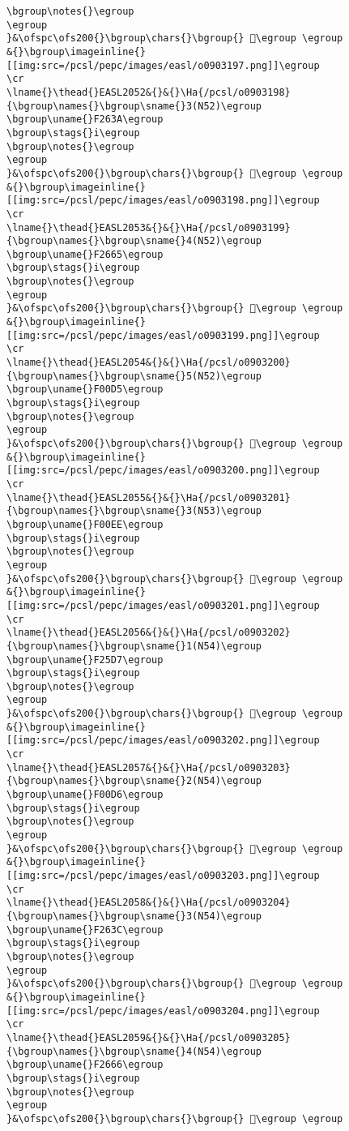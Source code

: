 \begin{verbatim}
\bgroup\notes{}\egroup
\egroup
}&\ofspc\ofs200{}\bgroup\chars{}\bgroup{} 󰃔\egroup \egroup
&{}\bgroup\imageinline{}[[img:src=/pcsl/pepc/images/easl/o0903197.png]]\egroup
\cr
\lname{}\thead{}EASL2052&{}&{}\Ha{/pcsl/o0903198}{\bgroup\names{}\bgroup\sname{}3(N52)\egroup
\bgroup\uname{}F263A\egroup
\bgroup\stags{}i\egroup
\bgroup\notes{}\egroup
\egroup
}&\ofspc\ofs200{}\bgroup\chars{}\bgroup{} 󲘺\egroup \egroup
&{}\bgroup\imageinline{}[[img:src=/pcsl/pepc/images/easl/o0903198.png]]\egroup
\cr
\lname{}\thead{}EASL2053&{}&{}\Ha{/pcsl/o0903199}{\bgroup\names{}\bgroup\sname{}4(N52)\egroup
\bgroup\uname{}F2665\egroup
\bgroup\stags{}i\egroup
\bgroup\notes{}\egroup
\egroup
}&\ofspc\ofs200{}\bgroup\chars{}\bgroup{} 󲙥\egroup \egroup
&{}\bgroup\imageinline{}[[img:src=/pcsl/pepc/images/easl/o0903199.png]]\egroup
\cr
\lname{}\thead{}EASL2054&{}&{}\Ha{/pcsl/o0903200}{\bgroup\names{}\bgroup\sname{}5(N52)\egroup
\bgroup\uname{}F00D5\egroup
\bgroup\stags{}i\egroup
\bgroup\notes{}\egroup
\egroup
}&\ofspc\ofs200{}\bgroup\chars{}\bgroup{} 󰃕\egroup \egroup
&{}\bgroup\imageinline{}[[img:src=/pcsl/pepc/images/easl/o0903200.png]]\egroup
\cr
\lname{}\thead{}EASL2055&{}&{}\Ha{/pcsl/o0903201}{\bgroup\names{}\bgroup\sname{}3(N53)\egroup
\bgroup\uname{}F00EE\egroup
\bgroup\stags{}i\egroup
\bgroup\notes{}\egroup
\egroup
}&\ofspc\ofs200{}\bgroup\chars{}\bgroup{} 󰃮\egroup \egroup
&{}\bgroup\imageinline{}[[img:src=/pcsl/pepc/images/easl/o0903201.png]]\egroup
\cr
\lname{}\thead{}EASL2056&{}&{}\Ha{/pcsl/o0903202}{\bgroup\names{}\bgroup\sname{}1(N54)\egroup
\bgroup\uname{}F25D7\egroup
\bgroup\stags{}i\egroup
\bgroup\notes{}\egroup
\egroup
}&\ofspc\ofs200{}\bgroup\chars{}\bgroup{} 󲗗\egroup \egroup
&{}\bgroup\imageinline{}[[img:src=/pcsl/pepc/images/easl/o0903202.png]]\egroup
\cr
\lname{}\thead{}EASL2057&{}&{}\Ha{/pcsl/o0903203}{\bgroup\names{}\bgroup\sname{}2(N54)\egroup
\bgroup\uname{}F00D6\egroup
\bgroup\stags{}i\egroup
\bgroup\notes{}\egroup
\egroup
}&\ofspc\ofs200{}\bgroup\chars{}\bgroup{} 󰃖\egroup \egroup
&{}\bgroup\imageinline{}[[img:src=/pcsl/pepc/images/easl/o0903203.png]]\egroup
\cr
\lname{}\thead{}EASL2058&{}&{}\Ha{/pcsl/o0903204}{\bgroup\names{}\bgroup\sname{}3(N54)\egroup
\bgroup\uname{}F263C\egroup
\bgroup\stags{}i\egroup
\bgroup\notes{}\egroup
\egroup
}&\ofspc\ofs200{}\bgroup\chars{}\bgroup{} 󲘼\egroup \egroup
&{}\bgroup\imageinline{}[[img:src=/pcsl/pepc/images/easl/o0903204.png]]\egroup
\cr
\lname{}\thead{}EASL2059&{}&{}\Ha{/pcsl/o0903205}{\bgroup\names{}\bgroup\sname{}4(N54)\egroup
\bgroup\uname{}F2666\egroup
\bgroup\stags{}i\egroup
\bgroup\notes{}\egroup
\egroup
}&\ofspc\ofs200{}\bgroup\chars{}\bgroup{} 󲙦\egroup \egroup

\end{verbatim}
